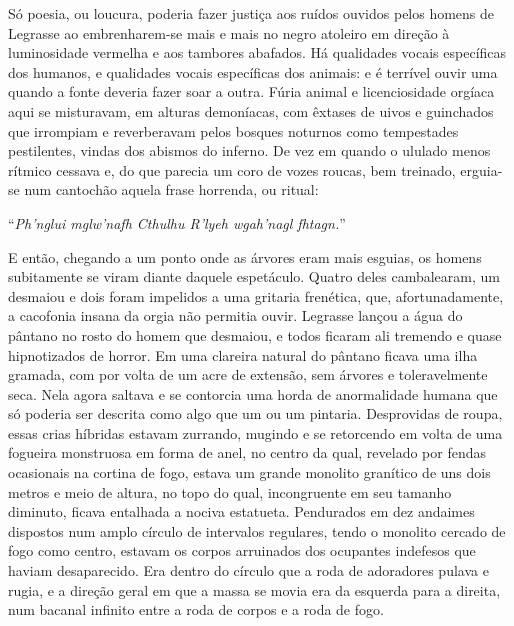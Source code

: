 \begin{pages}
\begin{Rightside}
Só poesia, ou loucura, poderia fazer justiça aos ruídos ouvidos pelos
homens de Legrasse ao embrenharem-se mais e mais no negro atoleiro em
direção à luminosidade vermelha e aos tambores abafados. Há qualidades
vocais específicas dos humanos, e qualidades vocais específicas dos
animais: e é terrível ouvir uma quando a fonte deveria fazer soar a
outra. Fúria animal e licenciosidade orgíaca aqui se misturavam, em
alturas demoníacas, com êxtases de uivos e guinchados que irrompiam e
reverberavam pelos bosques noturnos como tempestades pestilentes, vindas
dos abismos do inferno. De vez em quando o ululado menos rítmico cessava
e, do que parecia um coro de vozes roucas, bem treinado, erguia-se num
cantochão aquela frase horrenda, ou ritual:

``\emph{Ph'nglui mglw'nafh Cthulhu R'lyeh wgah'nagl fhtagn.}''

E então, chegando a um ponto onde as árvores eram mais esguias, os
homens subitamente se viram diante daquele espetáculo. Quatro deles
cambalearam, um desmaiou e dois foram impelidos a uma gritaria
frenética, que, afortunadamente, a cacofonia insana da orgia não
permitia ouvir. Legrasse lançou a água do pântano no rosto do homem que
desmaiou, e todos ficaram ali tremendo e quase hipnotizados de horror.
Em uma clareira natural do pântano ficava uma ilha gramada, com por
volta de um acre de extensão, sem árvores e toleravelmente seca. Nela
agora saltava e se contorcia uma horda de anormalidade humana que só
poderia ser descrita como algo que um  ou um  pintaria. Desprovidas de
roupa, essas crias híbridas estavam zurrando, mugindo e se retorcendo em
volta de uma fogueira monstruosa em forma de anel, no centro da qual,
revelado por fendas ocasionais na cortina de fogo, estava um grande
monolito granítico de uns dois metros e meio de altura, no topo do qual,
incongruente em seu tamanho diminuto, ficava entalhada a nociva
estatueta. Pendurados em dez andaimes dispostos num amplo círculo de
intervalos regulares, tendo o monolito cercado de fogo como centro,
estavam os corpos arruinados dos ocupantes indefesos que haviam
desaparecido. Era dentro do círculo que a roda de adoradores pulava e
rugia, e a direção geral em que a massa se movia era da esquerda para a
direita, num bacanal infinito entre a roda de corpos e a roda de fogo.


\end{Rightside}
\end{pages}
